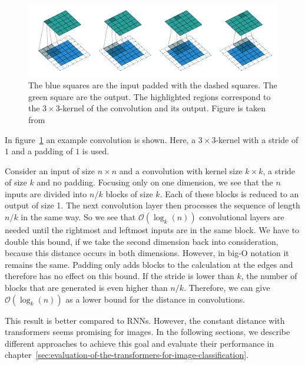 \documentclass[a4paper]{scrartcl}
\begin{document}
    \begin{figure}[hbtp]
        \centering
        \includegraphics[width=0.95\linewidth]{img/ConvolutionKernel}
        \caption[Convolution Kernel]{
            The blue squares are the input padded with the dashed squares.
            The green square are the output.
            The highlighted regions correspond to the $3 \times 3$-kernel of the convolution and its output.
            Figure is taken from~\cite{dumoulin2018guide}}
        \label{fig:convolution-kernel}
    \end{figure}

    In figure~\ref{fig:convolution-kernel} an example convolution is shown.
    Here, a $3 \times 3$-kernel with a stride of $1$ and a padding of $1$ is used.

    Consider an input of size $n \times n$ and a convolution with kernel size $k \times k$, a stride of size $k$ and no padding.
    Focusing only on one dimension, we see that the $n$ inputs are divided into $n/k$ blocks of size $k$.
    Each of these blocks is reduced to an output of size 1.
    The next convolution layer then processes the sequence of length $n/k$ in the same way.
    So we see that $\mathcal{O}(\log_k (n))$ convolutional layers are needed until the rightmost and leftmost inputs are in the same block.
    We have to double this bound, if we take the second dimension back into consideration, because this distance occurs in both dimensions.
    However, in big-O notation it remains the same.
    Padding only adds blocks to the calculation at the edges and therefore has no effect on this bound.
    If the stride is lower than $k$, the number of blocks that are generated is even higher than $n/k$.
    Therefore, we can give $\mathcal{O}(\log_k (n))$ as a lower bound for the distance in convolutions.

    This result is better compared to RNNs.
    However, the constant distance with transformers seems promising for images.
    In the following sections, we describe different approaches to achieve this goal and evaluate their performance in chapter~\ref{sec:evaluation-of-the-transformers-for-image-classification}.
\end{document}
